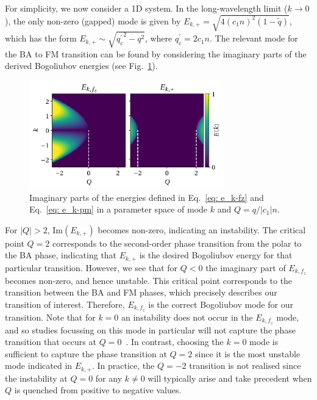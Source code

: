 For simplicity, we now consider a 1D system.
In the long-wavelength limit (\(k \rightarrow 0\)), the only non-zero (gapped)
mode is given by \(E_{k, +}= \sqrt{4{(c_1n)}^2(1-\tilde{q})}\), which has the
form \(E_{k, +} \sim \sqrt{{q_c^\prime}^2 - q^2}\), where
\(q_c^\prime = 2c_1n\).
The relevant mode for the BA to FM transition can be found by considering the
imaginary parts of the derived Bogoliubov energies (see
Fig.~\ref{fig: dens-spin-energies}).
\begin{figure}[tb]
    \centering
    \includegraphics[width=0.75\textwidth]{gfx/ch-spin1/bogoliubov_energies.pdf}
    \caption[Real and imaginary parts of the Bogoliubov energies for the
        broken-axisymmetry phase of a spin-1 BEC]
    {Imaginary parts of the energies defined in Eq.~\eqref{eq: e_k-fz} and
    Eq.~\eqref{eq: e_k-pm} in a parameter space of mode \(k\) and
    \( Q=q/|c_1|n \).\label{fig: dens-spin-energies}}
\end{figure}
For \(|Q|>2\), \(\text{Im}(E_{k, +})\) becomes non-zero, indicating an
instability.
The critical point \(Q = 2\) corresponds to the second-order phase transition
from the polar to the BA phase, indicating that \(E_{k, +}\) is the desired
Bogoliubov energy for that particular transition.
However, we see that for \(Q<0\) the imaginary part of \(E_{k, f_z}\) becomes
non-zero, and hence unstable.
This critical point corresponds to the transition between the BA and FM phases,
which precisely describes our transition of interest.
Therefore, \(E_{k, f_z}\) is the correct Bogoliubov mode for our transition.
Note that for \(k=0\) an instability does not occur in the \(E_{k, f_z}\) mode,
and so studies focussing on this mode in particular will not capture the phase
transition that occurs at \(Q=0\)~\cite{Matuszewski2009, Qiu2020,
Mirkhalaf2021}.
In contrast, choosing the \(k=0\) mode is sufficient to capture the phase
transition at \(Q=2\) since it is the most unstable mode indicated in
\(E_{k, +}\).
In practice, the \(Q=-2\) transition is not realised since the instability at
\(Q=0\) for any \(k \neq 0\) will typically arise and take precedent when
\(Q\) is quenched from positive to negative values.

